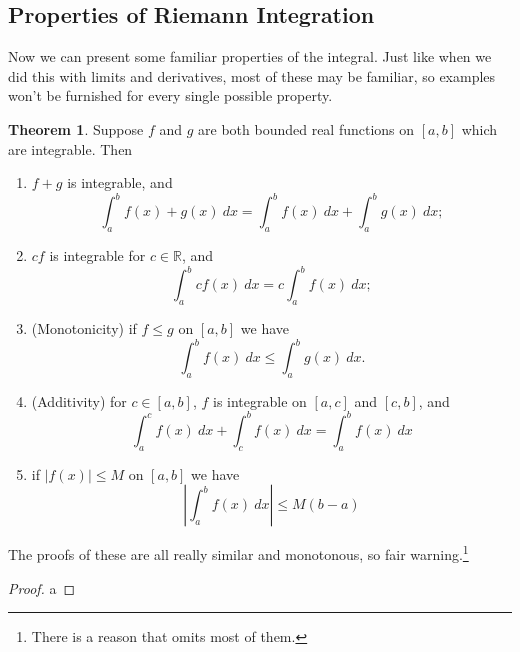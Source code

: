 \documentclass{article}
\newcommand{\R}{\mathbb{R}}
\theoremstyle{definition}
\newtheorem{theorem}{Theorem}[section]
\begin{document}
\subsection{Properties of Riemann Integration}
Now we can present some familiar properties of the integral. Just like when we did this with limits and derivatives, most of these may be familiar, so examples won't be furnished for every single possible property. 
\begin{theorem}
Suppose $ f $ and $ g $ are both bounded real functions on $ [a,b] $ which are integrable. Then 
\begin{enumerate}
	\item $ f+g $ is integrable, and $$ \int_{a}^{b}f(x)+g(x)\ dx=\int_{a}^{b}f(x)\ dx+\int_{a}^{b}g(x)\ dx;$$
	\item $ cf $ is integrable for $ c\in\R $, and $$\int_{a}^{b}cf(x)\ dx=c\int_{a}^{b}f(x)\ dx; $$
	\item (Monotonicity) if $ f\le g $ on $ [a,b] $ we have $$\int_{a}^{b}f(x)\ dx\le \int_{a}^{b}g(x)\ dx.$$
	\item (Additivity) for $ c\in[a,b] $, $ f $ is integrable on $ [a,c] $ and $ [c,b] $, and $$\int_{a}^{c}f(x)\ dx+\int_{c}^{b}f(x)\ dx=\int_{a}^{b}f(x)\ dx $$
	\item if $ |f(x)|\le M $ on $ [a,b] $ we have $$ \left\lvert\int_{a}^{b}f(x)\ dx \right\rvert\le M(b-a)$$
\end{enumerate}
The proofs of these are all really similar and monotonous, so fair warning.\footnote{There is a reason that \cite{rudin1964principles} omits most of them.}
\begin{proof}{\color{white}a}


\end{proof}
\end{theorem}
\end{document}
